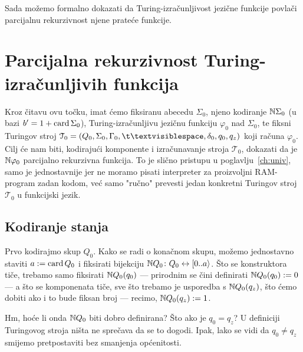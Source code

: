 Sada možemo formalno dokazati da Turing-izračunljivost jezične funkcije povlači parcijalnu rekurzivnost njene prateće funkcije.

\section{Parcijalna rekurzivnost  Turing-izračunljivih funkcija}\label{sec:tikp}

Kroz čitavu ovu točku, imat ćemo fiksiranu abecedu $\Sigma_0$, njeno kodiranje ${\mathbb N}\Sigma_0$ (u bazi $b'=1+\operatorname{card}\Sigma_0$), Turing-izračunljivu jezičnu funkciju $\varphi_0$ nad $\Sigma_0$, te fiksni Turingov stroj $\mathcal T_0=(Q_0,\Sigma_0,\Gamma_0,\bl,\delta_0,q_0,q_z)$ koji računa $\varphi_0$. Cilj će nam biti, kodirajući komponente i izračunavanje stroja $\mathcal T_0$, dokazati da je ${\mathbb N}\varphi_0$ parcijalno rekurzivna funkcija. To je slično pristupu u poglavlju~\ref{ch:univ}, samo je jednostavnije jer ne moramo pisati interpreter za proizvoljni RAM-program zadan kodom, već samo "ručno" prevesti jedan konkretni Turingov stroj $\mathcal T_0$ u funkcijski jezik.

\subsection{Kodiranje stanja}

Prvo kodirajmo skup $Q_0$. Kako se radi o konačnom skupu, možemo jednostavno staviti $a:=\operatorname{card} Q_0$ i fiksirati bijekciju ${\mathbb N} Q_0\colon Q_0\leftrightarrow[0..a\rangle$. Što se konstruktora tiče, trebamo samo fiksirati ${\mathbb N} Q_0(q_0)$ --- prirodnim se čini definirati ${\mathbb N} Q_0(q_0):=0$ --- a što se komponenata tiče, sve što trebamo je usporedba s ${\mathbb N} Q_0(q_z)$, što ćemo dobiti ako i to bude fiksan broj --- recimo, ${\mathbb N} Q_0(q_z):=1$.

Hm, hoće li onda ${\mathbb N} Q_0$ biti dobro definirana? Što ako je $q_0=q_z$? U definiciji Turingovog stroja ništa ne sprečava da se to dogodi. Ipak, lako se vidi da $q_0\not=q_z$ smijemo pretpostaviti bez smanjenja općenitosti.

